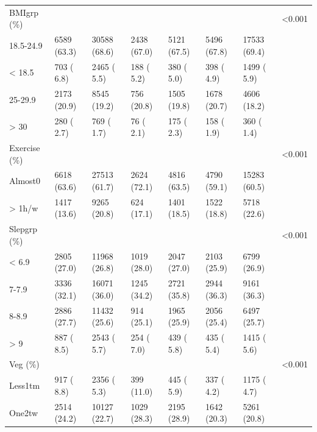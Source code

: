 \documentclass[]{tufte-handout}
\begin{document}
\begin{table}[!htbp]
\begin{tabular}[t]{llllllll}
\rowcolor{gray!6}  BMIgrp (\%) &  &  &  &  &  &  & <0.001\\
\hspace{1em}18.5-24.9 & 6589 (63.3) & 30588 (68.6) & 2438 (67.0) & 5121 (67.5) & 5496 (67.8) & 17533 (69.4) & \\
\rowcolor{gray!6}  \hspace{1em}< 18.5 & 703 ( 6.8) & 2465 ( 5.5) & 188 ( 5.2) & 380 ( 5.0) & 398 ( 4.9) & 1499 ( 5.9) & \\
\hspace{1em}25-29.9 & 2173 (20.9) & 8545 (19.2) & 756 (20.8) & 1505 (19.8) & 1678 (20.7) & 4606 (18.2) & \\
\rowcolor{gray!6}  \hspace{1em}> 30 & 280 ( 2.7) & 769 ( 1.7) & 76 ( 2.1) & 175 ( 2.3) & 158 ( 1.9) & 360 ( 1.4) & \\
Exercise (\%) &  &  &  &  &  &  & <0.001\\
\rowcolor{gray!6}  \hspace{1em}Almost0 & 6618 (63.6) & 27513 (61.7) & 2624 (72.1) & 4816 (63.5) & 4790 (59.1) & 15283 (60.5) & \\
\hspace{1em}> 1h/w & 1417 (13.6) & 9265 (20.8) & 624 (17.1) & 1401 (18.5) & 1522 (18.8) & 5718 (22.6) & \\
\rowcolor{gray!6}  Slepgrp (\%) &  &  &  &  &  &  & <0.001\\
\hspace{1em}< 6.9 & 2805 (27.0) & 11968 (26.8) & 1019 (28.0) & 2047 (27.0) & 2103 (25.9) & 6799 (26.9) & \\
\rowcolor{gray!6}  \hspace{1em}7-7.9 & 3336 (32.1) & 16071 (36.0) & 1245 (34.2) & 2721 (35.8) & 2944 (36.3) & 9161 (36.3) & \\
\hspace{1em}8-8.9 & 2886 (27.7) & 11432 (25.6) & 914 (25.1) & 1965 (25.9) & 2056 (25.4) & 6497 (25.7) & \\
\rowcolor{gray!6}  \hspace{1em}> 9 & 887 ( 8.5) & 2543 ( 5.7) & 254 ( 7.0) & 439 ( 5.8) & 435 ( 5.4) & 1415 ( 5.6) & \\
Veg (\%) &  &  &  &  &  &  & <0.001\\
\rowcolor{gray!6}  \hspace{1em}Less1tm & 917 ( 8.8) & 2356 ( 5.3) & 399 (11.0) & 445 ( 5.9) & 337 ( 4.2) & 1175 ( 4.7) & \\
\hspace{1em}One2tw & 2514 (24.2) & 10127 (22.7) & 1029 (28.3) & 2195 (28.9) & 1642 (20.3) & 5261 (20.8) & \\

\end{tabular}
\end{table}
\end{document}
